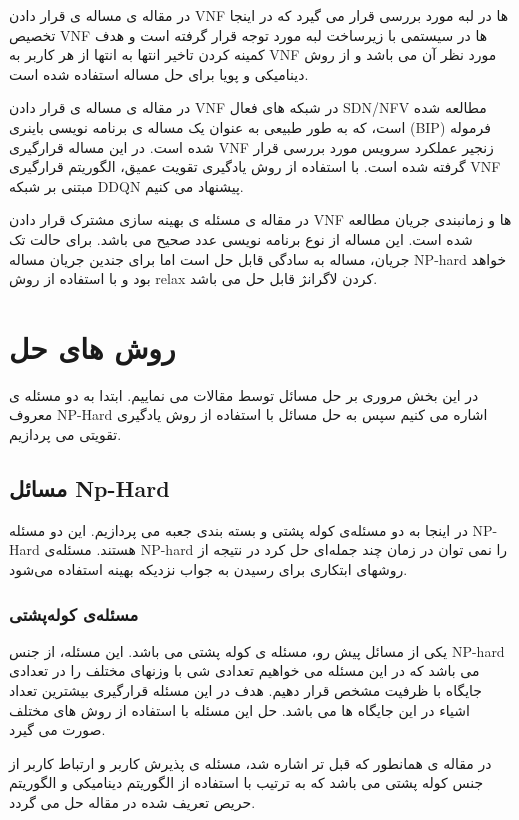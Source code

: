 در مقاله ی
\cite{cziva2018dynamic}
مساله ی قرار دادن VNF ها در لبه مورد بررسی قرار می گیرد که در اینجا تخصیص VNF ها در سیستمی با زیرساخت لبه مورد توجه قرار گرفته است و هدف کمینه کردن تاخیر انتها به انتها از هر کاربر به VNF مورد نظر آن می باشد و از روش دینامیکی و پویا برای حل مساله استفاده شده است. 

در مقاله ی
\cite{pei2019optimal}
مساله ی قرار دادن VNF در شبکه های فعال SDN/NFV مطالعه شده است، که به طور طبیعی به عنوان یک مساله ی برنامه نویسی باینری (BIP) فرموله شده است. 
در این مساله قرارگیری VNF زنجیر عملکرد سرویس مورد بررسی قرار گرفته شده است. 
با استفاده از روش یادگیری تقویت عمیق، الگوریتم قرارگیری VNF مبتنی بر شبکه DDQN  پیشنهاد می کنیم.

در مقاله ی
\cite{ren2020joint}
 مسئله ی بهینه سازی مشترک قرار دادن VNF ها و زمانبندی جریان مطالعه شده است.
 این مساله از نوع برنامه نویسی عدد صحیح می باشد.
 برای حالت تک جریان، مساله به سادگی قابل حل است اما برای جندین جریان مساله
 NP-hard
 خواهد بود و با استفاده از روش relax کردن لاگرانژ
 قابل حل می باشد.
\section{روش های حل}
در این بخش مروری بر حل مسائل توسط مقالات می نماییم.
ابتدا به دو مسئله ی معروف NP-Hard
اشاره می کنیم سپس به حل مسائل با استفاده از روش یادگیری تقویتی می پردازیم.
\subsection{مسائل Np-Hard}
در اینجا به دو مسئله‌ی کوله پشتی و بسته بندی جعبه می پردازیم. این دو مسئله NP-Hard هستند.
مسئله‌ی NP-hard را نمی توان در زمان چند جمله‌ای حل کرد در نتیجه از روشهای ابتکاری برای رسیدن به جواب نزدیکه بهینه استفاده می‌شود.
\subsubsection{ مسئله‌ی کوله‌پشتی }
یکی از مسائل پیش رو، مسئله ی کوله پشتی 
می باشد.
این مسئله، از جنس NP-hard
می باشد که در این مسئله می خواهیم تعدادی شی با وزنهای مختلف را در تعدادی جایگاه با ظرفیت مشخص قرار دهیم.
هدف در این مسئله قرارگیری بیشترین تعداد اشیاء در این جایگاه ها می باشد.
حل این مسئله با استفاده از روش های مختلف صورت می گیرد.

در مقاله ی \cite{lee2018dynamic}
همانطور که قبل تر اشاره شد، مسئله ی پذیرش کاربر و ارتباط کاربر از جنس کوله پشتی
 می باشد که به ترتیب با استفاده از الگوریتم دینامیکی و الگوریتم حریص تعریف شده در مقاله
 حل می گردد.

